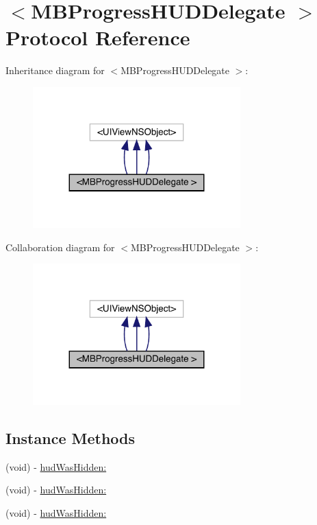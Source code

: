 \hypertarget{protocol_m_b_progress_h_u_d_delegate_01-p}{}\section{$<$M\+B\+Progress\+H\+U\+D\+Delegate $>$ Protocol Reference}
\label{protocol_m_b_progress_h_u_d_delegate_01-p}


Inheritance diagram for $<$M\+B\+Progress\+H\+U\+D\+Delegate $>$\+:\nopagebreak
\begin{figure}[H]
\begin{center}
\leavevmode
\includegraphics[width=227pt]{protocol_m_b_progress_h_u_d_delegate_01-p__inherit__graph}
\end{center}
\end{figure}


Collaboration diagram for $<$M\+B\+Progress\+H\+U\+D\+Delegate $>$\+:\nopagebreak
\begin{figure}[H]
\begin{center}
\leavevmode
\includegraphics[width=227pt]{protocol_m_b_progress_h_u_d_delegate_01-p__coll__graph}
\end{center}
\end{figure}
\subsection*{Instance Methods}
\begin{DoxyCompactItemize}
\item 
(void) -\/ \mbox{\hyperlink{protocol_m_b_progress_h_u_d_delegate_01-p_a381495ae06f579ec2ad90c23d4fdfaea}{hud\+Was\+Hidden\+:}}
\item 
(void) -\/ \mbox{\hyperlink{protocol_m_b_progress_h_u_d_delegate_01-p_a381495ae06f579ec2ad90c23d4fdfaea}{hud\+Was\+Hidden\+:}}
\item 
(void) -\/ \mbox{\hyperlink{protocol_m_b_progress_h_u_d_delegate_01-p_a381495ae06f579ec2ad90c23d4fdfaea}{hud\+Was\+Hidden\+:}}
\end{DoxyCompactItemize}


